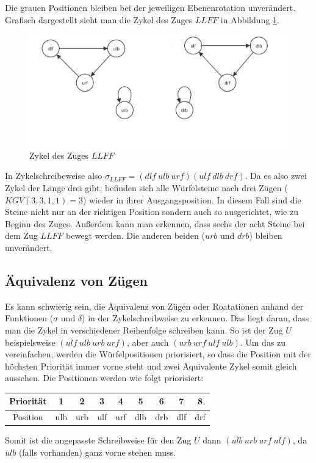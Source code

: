 \documentclass[12pt,a4paper, usenames, dvipsnames]{article}
\begin{document}
Die grauen Positionen bleiben bei der jeweiligen Ebenenrotation unverändert. 
Grafisch dargestellt sieht man die Zykel des Zuges $LLFF$ in Abbildung \ref{17}. 
\begin{figure}[h]
\centering
\includegraphics[scale=0.25]{zykel_LLFF.png}
\caption[Zykel des Zuges $LLFF$]{Zykel des Zuges $LLFF$}
\label{17}
\end{figure}
In Zykelschreibeweise also $\sigma_{LLFF}=(dlf \ ulb \ urf)(ulf \ dlb \ drf)$.
Da es also zwei Zykel der Länge drei gibt, befinden sich alle Würfelsteine nach drei Zügen ($KGV(3,3,1,1)=3$) wieder in ihrer Ausgangsposition. 
In diesem Fall sind die Steine nicht nur an der richtigen Position sondern auch so ausgerichtet, wie zu Beginn des Zuges. 
Außerdem kann man erkennen, dass sechs der acht Steine bei dem Zug $LLFF$ bewegt werden. Die anderen beiden ($urb$ und $drb$) bleiben unverändert. 

%
%
%
%
%
%
%
%
%
%
%
%
%
%
%
%
%
%
%
%
\subsection*{Äquivalenz von Zügen}


Es kann schwierig sein, die Äquivalenz von Zügen oder Roatationen anhand der Funktionen ($\sigma$ und $\delta$) in der Zykelschreibweise zu erkennen. 
Das liegt daran, dass man die Zykel in verschiedener Reihenfolge schreiben kann. So ist der Zug $U$ beispielsweise $ (ulf \ ulb \ urb \ urf)$, aber auch $(urb \ urf \ ulf \ ulb)$.
Um das zu vereinfachen, werden die Würfelpositionen priorisiert, so dass die Position mit der höchsten Priorität immer vorne steht und zwei Äquivalente Zykel somit gleich aussehen. 
Die Positionen werden wie folgt priorisiert:
\begin{center}
\begin{tabular}{ccccccccc}
Priorität & 1 & 2 & 3 & 4 & 5 & 6 & 7 & 8 \\
\hline
Position  & ulb & urb & ulf & urf & dlb & drb & dlf & drf \\
\end{tabular}
\end{center}
Somit ist die angepasste Schreibweise für den Zug $U$ dann $(ulb \ urb \ urf \ ulf)$, da $ulb$ (falls vorhanden) ganz vorne stehen muss.
\end{document}
